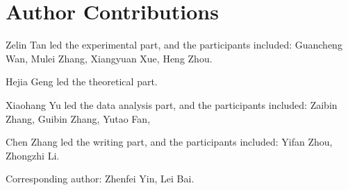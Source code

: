 \section{Author Contributions}
Zelin Tan led the experimental part, and the participants included: Guancheng Wan, Mulei Zhang, Xiangyuan Xue, Heng Zhou.

Hejia Geng led the theoretical part.

Xiaohang Yu led the data analysis part, and the participants included:  Zaibin Zhang,  Guibin Zhang, Yutao Fan,

Chen Zhang led the writing part, and the participants included: Yifan Zhou,  Zhongzhi Li.

Corresponding author: Zhenfei Yin, Lei Bai.
